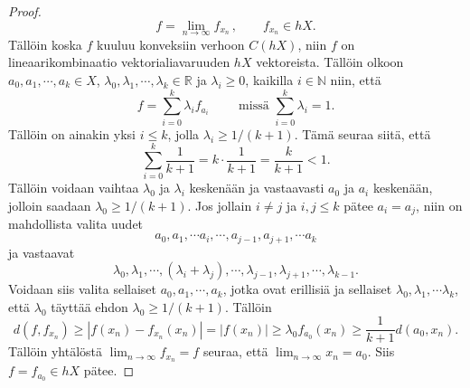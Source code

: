 \documentclass[12pt,a4paper,leqno]{report}
\newcommand{\R}{\mathbb{R}}
\newcommand{\N}{\mathbb{N}}
\theoremstyle{plain}
\theoremstyle{definition}
\theoremstyle{remark}
\begin{document}
\begin{proof}
$$f=\lim_{n\rightarrow\infty} f_{x_n} \, , \qquad f_{x_n}\in hX.$$ 
Tällöin koska $f$ kuuluu konveksiin verhoon $C(hX)$, niin $f$ on lineaarikombinaatio vektorialiavaruuden $hX$ vektoreista. Tällöin olkoon $a_0,a_1,\cdots, a_k \in X$, $\lambda_0,\lambda_1,\cdots, \lambda_k \in \R$ ja $\lambda_i\geq 0$, kaikilla $ i\in\N$ niin, että $$f=\sum_{i=0}^k \lambda_i f_{a_i}\qquad \text{ missä } \sum_{i=0}^k \lambda_i =1.$$
Tällöin on ainakin yksi $i\leq k$, jolla $\lambda_i \geq 1/(k+1)$. Tämä seuraa siitä, että $$\sum_{i=0}^k \frac{1}{k+1}=k\cdot \dfrac{1}{k+1}=\dfrac{k}{k+1}<1 .$$ Tällöin voidaan vaihtaa $\lambda_0$ ja $\lambda_i$ keskenään ja vastaavasti $a_0$ ja $a_i$ keskenään, jolloin saadaan $\lambda_0\geq 1/(k+1)$. Jos jollain $i\neq j$ ja $i,j\leq k$ %
pätee $ a_i=a_j$, niin on mahdollista valita uudet $$a_0,a_1,\cdots a_i,\cdots, a_{j-1},a_{j+1},\cdots a_{k}$$ ja vastaavat $$\lambda_0,\lambda_1,\cdots, (\lambda_i+\lambda_j),\cdots ,
\lambda_{j-1},
\lambda_{j+1},\cdots, \lambda_{k-1}.$$ 
Voidaan siis valita sellaiset $a_0,a_1,\cdots, a_k$, jotka ovat erillisiä ja sellaiset $\lambda_0,\lambda_1,\cdots \lambda_k$, että $\lambda_0$ täyttää ehdon $\lambda_0\geq 1/(k+1)$. Tällöin $$d(f,f_{x_n})\geq |f(x_n)-f_{x_n}(x_n)|=|f(x_n)|\geq \lambda_0 f_{a_0}(x_n)\geq \dfrac{1}{k+1}d(a_0,x_n).$$
Tällöin yhtälöstä $\lim_{n\rightarrow\infty} f_{x_n}=f$ seuraa, että $\lim_{n\rightarrow\infty }x_n=a_0$. Siis $ f=f_{a_0}\in hX$ pätee.

\end{proof}
\end{document}
